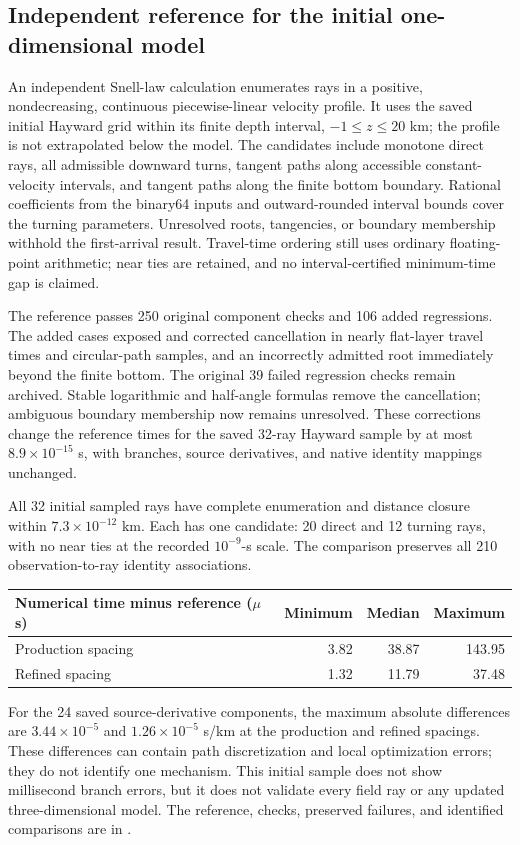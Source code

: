 \documentclass[11pt]{article}
\begin{document}
\subsection{Independent reference for the initial one-dimensional model}
An independent Snell-law calculation enumerates rays in a positive,
nondecreasing, continuous piecewise-linear velocity profile. It uses the
saved initial Hayward grid within its finite depth interval, $-1\leq z\leq20$
km; the profile is not extrapolated below the model. The candidates include
monotone direct rays, all admissible downward turns, tangent paths along
accessible constant-velocity intervals, and tangent paths along the finite
bottom boundary. Rational coefficients from the binary64 inputs and
outward-rounded interval bounds cover the turning parameters. Unresolved
roots, tangencies, or boundary membership withhold the first-arrival result.
Travel-time ordering still uses ordinary floating-point arithmetic; near ties
are retained, and no interval-certified minimum-time gap is claimed.

The reference passes 250 original component checks and 106 added regressions.
The added cases exposed and corrected cancellation in nearly flat-layer
travel times and circular-path samples, and an incorrectly admitted root
immediately beyond the finite bottom. The original 39 failed regression
checks remain archived. Stable logarithmic and half-angle formulas remove
the cancellation; ambiguous boundary membership now remains unresolved.
These corrections change the reference times for the saved 32-ray Hayward
sample by at most $8.9\times10^{-15}$ s, with branches, source derivatives,
and native identity mappings unchanged.

All 32 initial sampled rays have complete enumeration and distance closure
within $7.3\times10^{-12}$ km. Each has one candidate: 20 direct and 12
turning rays, with no near ties at the recorded $10^{-9}$-s scale.
The comparison preserves all 210 observation-to-ray identity associations.
\begin{center}
\begin{tabular}{lrrr}
\toprule
Numerical time minus reference ($\mu$s) & Minimum & Median & Maximum\\
\midrule
Production spacing & 3.82 & 38.87 & 143.95\\
Refined spacing & 1.32 & 11.79 & 37.48\\
\bottomrule
\end{tabular}
\end{center}
For the 24 saved source-derivative components, the maximum absolute
differences are $3.44\times10^{-5}$ and $1.26\times10^{-5}$ s/km at the
production and refined spacings. These differences can contain path
discretization and local optimization errors; they do not identify one
mechanism. This initial sample does not show millisecond branch errors, but
it does not validate every field ray or any updated three-dimensional model.
The reference, checks, preserved failures, and identified comparisons are in
.
\end{document}
